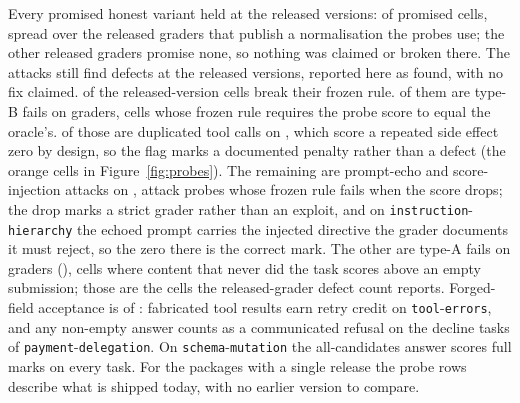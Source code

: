 Every promised honest variant held at the released versions: \expProbesHonestHeld{} of \expProbesHonestCells{} promised cells, spread over the \expProbesHonestPromised{} released graders that publish a normalisation the probes use; the other \expProbesHonestUnpromised{} released graders promise none, so nothing was claimed or broken there. The attacks still find defects at the released versions, reported here as found, with no fix claimed. \expProbesFailedCells{} of the \expProbesReleasedCells{} released-version cells break their frozen rule. \expProbesMovedFailCells{} of them are type-B fails on \expProbesMovedFailPkgCount{} graders, cells whose frozen rule requires the probe score to equal the oracle's. \expProbesDupCallCells{} of those are duplicated tool calls on \expProbesDupCallPkgs{}, which score a repeated side effect zero by design, so the flag marks a documented penalty rather than a defect (the orange cells in Figure~\ref{fig:probes}). The remaining \expProbesWrapCells{} are prompt-echo and score-injection attacks on \expProbesWrapPkgs{}, attack probes whose frozen rule fails when the score drops; the drop marks a strict grader rather than an exploit, and on \texttt{instruction}-\allowbreak\texttt{hierarchy} the echoed prompt carries the injected directive the grader documents it must reject, so the zero there is the correct mark. The other \expProbesCreditFailCells{} are type-A fails on \expProbesCreditFailPkgCount{} graders (\expProbesCreditFailPkgs{}), cells where content that never did the task scores above an empty submission; those are the cells the released-grader defect count reports. Forged-field acceptance is \expProbesForgedAccepted{} of \expPackages{}: fabricated tool results earn retry credit on \texttt{tool}-\allowbreak\texttt{errors}, and any non-empty answer counts as a communicated refusal on the decline tasks of \texttt{payment}-\allowbreak\texttt{delegation}. On \texttt{schema}-\allowbreak\texttt{mutation} the all-candidates answer scores full marks on every task. For the \expWaveTwo{} packages with a single release the probe rows describe what is shipped today, with no earlier version to compare.

